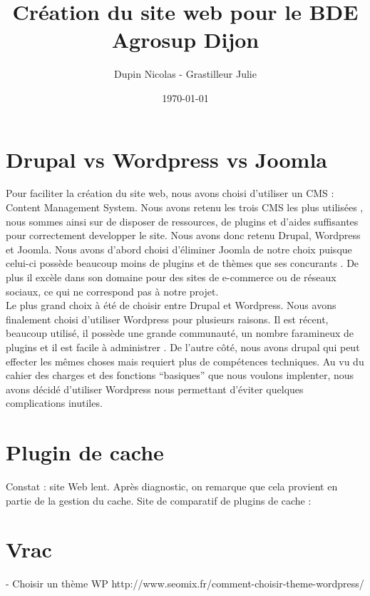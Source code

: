 \documentclass{report}
\title{Création du site web pour le BDE Agrosup Dijon}
\author{Dupin Nicolas - Grastilleur Julie}
\date{\today}
\begin{document}
\section*{Drupal vs Wordpress vs Joomla}

Pour faciliter la création du site web, nous avons choisi d'utiliser un CMS : Content Management System. Nous avons retenu les trois CMS les plus utilisées \cite{popularite1}, nous sommes ainsi sur de disposer de ressources, de plugins et d'aides suffisantes pour correctement developper le site. Nous avons donc retenu Drupal, Wordpress et Joomla. Nous avons d'abord choisi d'éliminer Joomla de notre choix puisque celui-ci possède beaucoup moins de plugins et de thèmes que ses concurants \cite{comparatif1}. De plus il excèle dans son domaine pour des sites de e-commerce ou de réseaux sociaux, ce qui ne correspond pas à notre projet.\\


Le plus grand choix à été de choisir entre Drupal et Wordpress. Nous avons finalement choisi d'utiliser Wordpress pour plusieurs raisons. Il est récent, beaucoup utilisé, il possède une grande communauté, un nombre faramineux de plugins et il est facile à administrer \cite{pourquoiWP1, pourquoiWP2}. De l'autre côté, nous avons drupal qui peut effecter les mêmes choses mais requiert plus de compétences techniques. Au vu du cahier des charges et des fonctions "`basiques"' que nous voulons implenter, nous avons décidé d'utiliser Wordpress nous permettant d'éviter quelques complications inutiles.

\newpage


\section*{Plugin de cache}
Constat : site Web lent. Après diagnostic, on remarque que cela provient en partie de la gestion du cache.
Site de comparatif de plugins de cache : \cite{pluginsCache} \cite{pluginsCache2}

\section*{Vrac}

- Choisir un thème WP
http://www.seomix.fr/comment-choisir-theme-wordpress/




\end{document}
